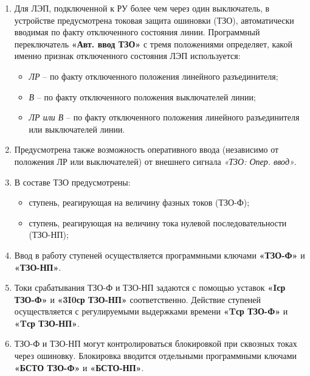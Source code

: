 \color{black}

\begin{enumerate}

\item
Для ЛЭП, подключенной к РУ более чем через один выключатель, в устройстве предусмотрена токовая защита ошиновки (ТЗО), автоматически вводимая по факту отключенного состояния линии. Программный переключатель \textbf{«Авт. ввод ТЗО»} с тремя положениями определяет, какой именно признак отключенного состояния ЛЭП используется:
\begin{itemize}
    \item \textit{ЛР} -- по факту отключенного положения линейного разъединителя;
    \item \textit{В} -- по факту отключенного положения выключателей линии;
	\item \textit{ЛР или В} -- по факту отключенного положения линейного разъединителя или выключателей линии.
\end{itemize}

\item
Предусмотрена также возможность оперативного ввода (независимо от положения ЛР или выключателей) от внешнего сигнала \textit{«ТЗО: Опер. ввод»}.

\item
В составе ТЗО предусмотрены:
\begin{itemize}
    \item ступень, реагирующая на величину фазных токов (ТЗО-Ф);
    \item ступень, реагирующая на величину тока нулевой последовательности (ТЗО-НП);
\end{itemize}

\item
Ввод в работу ступеней осуществляется программными ключами \textbf{«ТЗО-Ф»} и \textbf{«ТЗО-НП»}.

\item
Токи срабатывания ТЗО-Ф и ТЗО-НП задаются с помощью уставок \textbf{«Iср ТЗО-Ф»} и \textbf{«3I0ср ТЗО-НП»} соответственно. Действие ступеней осуществляется с регулируемыми выдержками времени \textbf{«Tср ТЗО-Ф»} и \textbf{«Tср ТЗО-НП»}.

\item
ТЗО-Ф и ТЗО-НП могут контролироваться блокировкой при сквозных токах через ошиновку. Блокировка вводится отдельными программными ключами \textbf{«БСТО ТЗО-Ф»} и \textbf{«БСТО-НП»}.


\end{enumerate}
